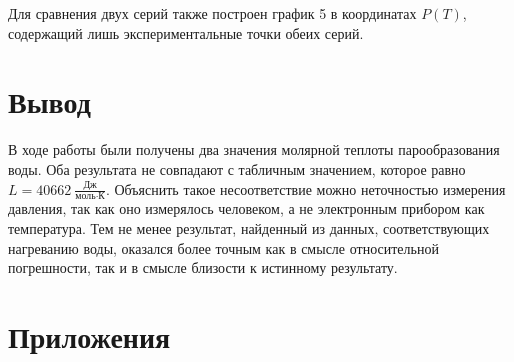 \documentclass[15pt,a5paper,reqno]{article}
\begin{document}
    Для сравнения двух серий также построен график 5 в координатах $P(T)$, содержащий лишь экспериментальные точки обеих серий.
    
\section{Вывод}

    В ходе работы были получены два значения молярной теплоты парообразования воды. Оба результата не совпадают с табличным значением, которое равно $L = 40662\ \frac{\text{Дж}}{\text{моль}\cdot\text{К}}$. Объяснить такое несоответствие можно неточностью измерения давления, так как оно измерялось человеком, а не электронным прибором как температура. Тем не менее результат, найденный из данных, соответствующих нагреванию воды, оказался более точным как в смысле относительной погрешности, так и в смысле близости к истинному результату.

\newpage
\section{Приложения}
\end{document}
